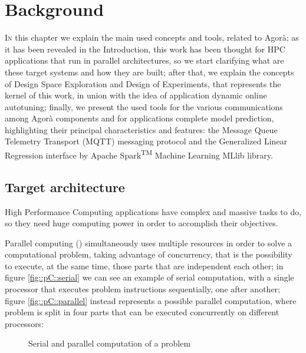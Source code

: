 \chapter{Background}\label{back}

\lettrine{I}{n} this chapter we explain the main used concepts and tools, related to Agorà; as it has been revealed in the Introduction, this work has been thought for HPC applications that run in parallel architectures, so we start clarifying what are these target systems and how they are built; after that, we explain the concepts of Design Space Exploration and Design of Experiments, that represents the kernel of this work, in union with the idea of application dynamic online autotuning; finally, we present the used tools for the various communications among Agorà components and for applications complete model prediction, highlighting their principal characteristics and features: the Message Queue Telemetry Transport (MQTT) messaging protocol and the Generalized Linear Regression interface by Apache Spark\textsuperscript{TM} Machine Learning MLlib library.

\section{Target architecture}

High Performance Computing applications have complex and massive tasks to do, so they need huge computing power in order to accomplish their objectives.

Parallel computing (\cite{barney2012introduction}) simultaneously uses multiple resources in order to solve a computational problem, taking advantage of concurrency, that is the possibility to execute, at the same time, those parts that are independent each other; in figure \ref{fig::pC::serial} we can see an example of serial computation, with a single processor that executes problem instructions sequentially, one after another; figure \ref{fig::pC::parallel} instead represents a possible parallel computation, where problem is split in four parts that can be executed concurrently on different processors:

\begin{figure}[H]

    \centering

    \quad
    
    \caption{Serial and parallel computation of a problem}

\end{figure}

